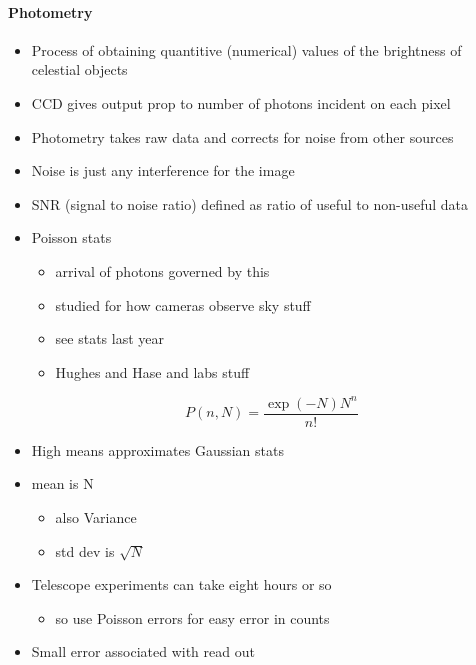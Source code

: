 \documentclass[a4paper,11pt,normalem]{article}
\begin{document}
\paragraph{Photometry}
\begin{itemize}
    \item Process of obtaining quantitive (numerical) values of the brightness of celestial objects
    \item CCD gives output prop to number of photons incident on each pixel
    \item Photometry takes raw data and corrects for noise from other sources
    \item Noise is just any interference for the image
    \item SNR (signal to noise ratio) defined as ratio of useful to non-useful data
    \item Poisson stats
        \begin{itemize}
            \item arrival of photons governed by this
            \item studied for how cameras observe sky stuff
            \item see stats last year
            \item Hughes and Hase and labs stuff
        \end{itemize}
        \begin{equation*}
            P(n,N) = \frac{\exp(-N)N^n}{n!}
        \end{equation*}
    \item High means approximates Gaussian stats
    \item mean is N
        \begin{itemize}
            \item also Variance
            \item std dev is \(\sqrt{N}\)
        \end{itemize}
    \item Telescope experiments can take eight hours or so
        \begin{itemize}
            \item so use Poisson errors for easy error in counts
        \end{itemize}
    \item Small error associated with read out
\end{itemize}
\end{document}
